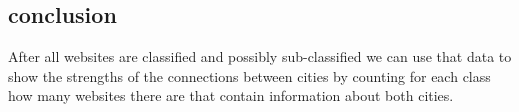 \subsection{conclusion}
After all websites are classified and possibly sub-classified we can use that data to show the strengths of the connections between cities by counting for each class how many websites there are that contain information about both cities. 




